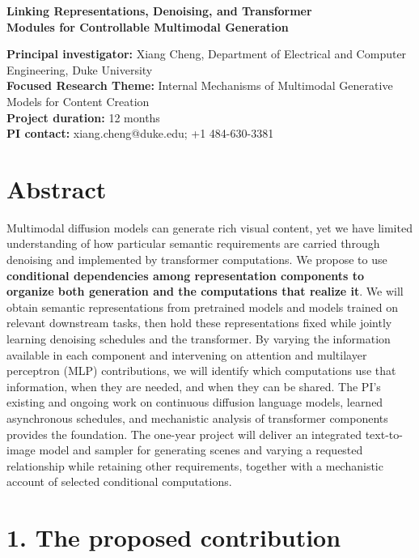 \documentclass[11pt,letterpaper]{article}
\begin{document}
\begin{center}
{\LARGE\bfseries Linking Representations, Denoising, and Transformer\\[2pt] Modules for Controllable Multimodal Generation\par}
\end{center}
\vspace{-5pt}

\textbf{Principal investigator:} Xiang Cheng, Department of Electrical and Computer Engineering, Duke University\\
\textbf{Focused Research Theme:} Internal Mechanisms of Multimodal Generative Models for Content Creation\\
\textbf{Project duration:} 12 months\\
\textbf{PI contact:} xiang.cheng@duke.edu; +1 484-630-3381

\hypertarget{abstract}{%
\section{Abstract}\label{abstract}}

Multimodal diffusion models can generate rich visual content, yet we have limited understanding of how particular semantic requirements are carried through denoising and implemented by transformer computations. We propose to use \textbf{conditional dependencies among representation components to organize both generation and the computations that realize it}. We will obtain semantic representations from pretrained models and models trained on relevant downstream tasks, then hold these representations fixed while jointly learning denoising schedules and the transformer. By varying the information available in each component and intervening on attention and multilayer perceptron (MLP) contributions, we will identify which computations use that information, when they are needed, and when they can be shared. The PI's existing and ongoing work on continuous diffusion language models, learned asynchronous schedules, and mechanistic analysis of transformer components provides the foundation. The one-year project will deliver an integrated text-to-image model and sampler for generating scenes and varying a requested relationship while retaining other requirements, together with a mechanistic account of selected conditional computations.

\hypertarget{the-proposed-contribution}{%
\section{1. The proposed contribution}\label{the-proposed-contribution}}
\end{document}
